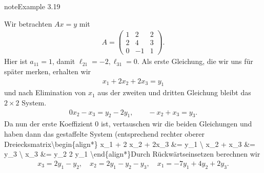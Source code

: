\documentclass[letterpaper,10pt,english]{jupyterBook}
\begin{document}
\begin{sphinxadmonition}{note}{Example 3.19}



Wir betrachten \(Ax=y\) mit
\begin{equation*}
\begin{split} A = \left( \begin{matrix} 1 & 2 & 2 \\ 2 & 4 & 3 \\ 0 & -1 & 1 \end{matrix} \right).\end{split}
\end{equation*}
Hier ist \(a_{11}=1\), damit \(\ell_{21} = -2, \ell_{31} = 0. \) Als erste Gleichung, die wir uns für später merken, erhalten wir
\begin{equation*}
\begin{split} x_1 + 2 x_2 + 2x_3 = y_1\end{split}
\end{equation*}
und nach Elimination von \(x_1\) aus der zweiten und dritten Gleichung bleibt das \(2 \times 2 \) System.
\begin{equation*}
\begin{split} 0 x_2 -x_3 = y_2 -2 y_1, \qquad -x_2 + x_3 = y_3.\end{split}
\end{equation*}
Da nun der erste Koeffizient \(0\) ist, vertauschen wir die beiden Gleichungen und haben dann das gestaffelte System (entsprechend rechter oberer Dreiecksmatrix\textbackslash{}begin\{align*\}
x\_1 + 2 x\_2 + 2x\_3 \&= y\_1 \textbackslash{} \sphinxhyphen{}x\_2 + x\_3 \&= y\_3 \textbackslash{}
\sphinxhyphen{}x\_3 \&= y\_2 \sphinxhyphen{}2 y\_1
\textbackslash{}end\{align*\}Durch Rückwärtseinsetzen berechnen wir
\begin{equation*}
\begin{split} x_3=2y_1 - y_2, \quad x_2 = 2 y_1 -y_2 -y_3, \quad x_1 = - 7 y_1 + 4y_2 +2 y_3.\end{split}
\end{equation*}\end{sphinxadmonition}
\end{document}
